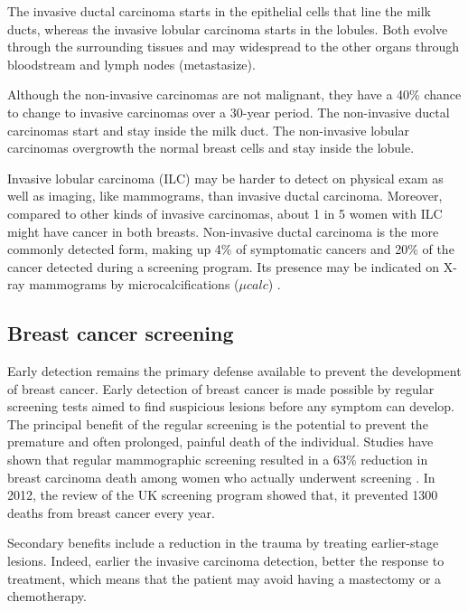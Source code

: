The invasive ductal carcinoma starts in the epithelial cells that line the milk ducts, whereas the invasive lobular carcinoma starts in the lobules. Both evolve through the surrounding tissues and may widespread to the other organs through bloodstream and lymph nodes (metastasize). 

Although the non-invasive carcinomas are not malignant, they have a 40\% chance to change to invasive carcinomas over a 30-year period. The non-invasive ductal carcinomas start and stay inside the milk duct. The non-invasive lobular carcinomas overgrowth the normal breast cells and stay inside the lobule. 

Invasive lobular carcinoma (ILC)  may be harder to detect on physical exam as well as imaging, like mammograms, than invasive ductal carcinoma. Moreover, compared to other kinds of invasive carcinomas, about 1 in 5 women with ILC might have cancer in both breasts.  Non-invasive ductal carcinoma is the more commonly detected form, making up 4\% of symptomatic cancers and 20\% of the cancer detected during a screening program. Its presence may be indicated on X-ray mammograms by microcalcifications ($\mu calc$) \citep{acs_cancer_2017}.
 
\subsection{Breast cancer screening}\label{subsection:cancerscrenning}
Early detection remains the primary defense available to prevent the development of breast cancer. Early detection of breast cancer is made possible by  regular screening tests aimed to find suspicious lesions before any symptom can develop.  The principal benefit of the regular screening is the potential to prevent the premature and often prolonged, painful death of the individual. Studies have shown that regular mammographic screening resulted in a $63\%$ reduction in breast carcinoma death among women who actually underwent screening \citep{tabar_beyond_2001}. In 2012, the review of the UK screening program \citep{NHSBSP_2012} showed that, it prevented 1300 deaths from breast cancer every year. 

Secondary benefits include a reduction in the trauma by treating earlier-stage lesions. Indeed, earlier the invasive carcinoma detection, better the response to treatment, which means that the patient may avoid having a mastectomy or a chemotherapy.

